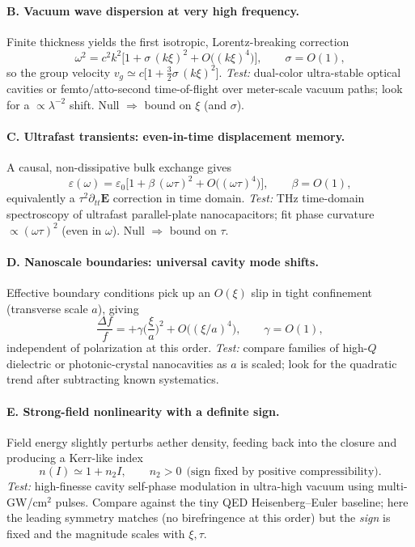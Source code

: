\paragraph{B. Vacuum wave dispersion at very high frequency.}
Finite thickness yields the first isotropic, Lorentz-breaking correction
\begin{equation}
\omega^2=c^2 k^2\Big[1+\sigma\,(k\xi)^2+O\big((k\xi)^4\big)\Big],\qquad \sigma=O(1),
\end{equation}
so the group velocity $v_g\simeq c\big[1+\tfrac{3}{2}\sigma\,(k\xi)^2\big]$.
\emph{Test:} dual-color ultra-stable optical cavities or femto/atto-second time-of-flight over meter-scale vacuum paths; look for a $\propto\lambda^{-2}$ shift. Null $\Rightarrow$ bound on $\xi$ (and $\sigma$).

\paragraph{C. Ultrafast transients: even-in-time displacement memory.}
A causal, non-dissipative bulk exchange gives
\begin{equation}
\varepsilon(\omega)=\varepsilon_0\Big[1+\beta\,(\omega\tau)^2+O\big((\omega\tau)^4\big)\Big],\qquad \beta=O(1),
\end{equation}
equivalently a $\tau^2\partial_{tt}\mathbf E$ correction in time domain.
\emph{Test:} THz time-domain spectroscopy of ultrafast parallel-plate nanocapacitors; fit phase curvature $\propto(\omega\tau)^2$ (even in $\omega$). Null $\Rightarrow$ bound on $\tau$.

\paragraph{D. Nanoscale boundaries: universal cavity mode shifts.}
Effective boundary conditions pick up an $O(\xi)$ slip in tight confinement (transverse scale $a$), giving
\begin{equation}
\frac{\Delta f}{f}=+\gamma\Big(\frac{\xi}{a}\Big)^2 + O\big((\xi/a)^4\big),\qquad \gamma=O(1),
\end{equation}
independent of polarization at this order.
\emph{Test:} compare families of high-$Q$ dielectric or photonic-crystal nanocavities as $a$ is scaled; look for the quadratic trend after subtracting known systematics.

\paragraph{E. Strong-field nonlinearity with a definite sign.}
Field energy slightly perturbs aether density, feeding back into the closure and producing a Kerr-like index
\begin{equation}
n(I)\simeq 1+n_2 I,\qquad n_2>0 \ \ \text{(sign fixed by positive compressibility)}.
\end{equation}
\emph{Test:} high-finesse cavity self-phase modulation in ultra-high vacuum using multi-GW/cm$^2$ pulses. Compare against the tiny QED Heisenberg–Euler baseline; here the leading symmetry matches (no birefringence at this order) but the \emph{sign} is fixed and the magnitude scales with $\xi,\tau$.

